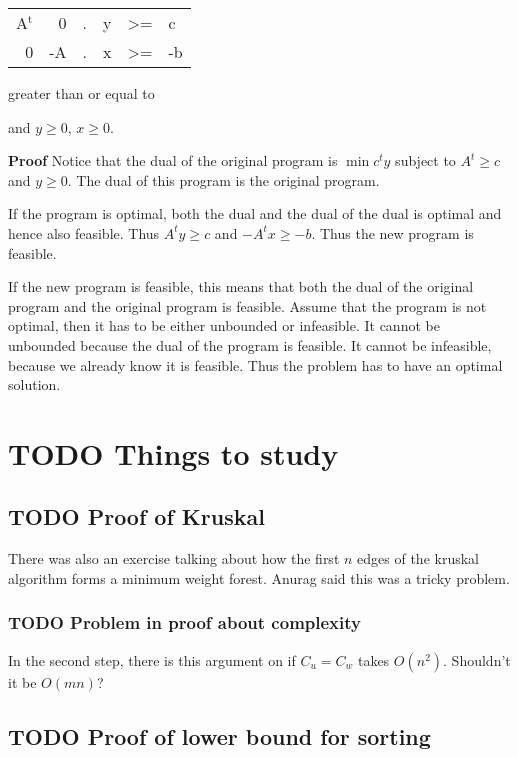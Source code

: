 \documentclass[11pt]{article}
\def\min{\operatorname{min}}
\begin{document}
\begin{center}
\begin{tabular}{rrllll}
A\(^{\text{t}}\) & 0 & . & y & >= & c\\
0 & -A & . & x & >= & -b\\
\end{tabular}
\end{center}

greater than or equal to

and \(y \ge 0\), \(x \ge 0\).

\textbf{Proof} Notice that the dual of the original program is \(\min c^t y\)
subject to \(A^t \ge c\) and \(y \ge 0\). The dual of this program is the
original program.

If the program is optimal, both the dual and the dual of the dual is optimal
and hence also feasible. Thus \(A^t y \ge c\) and \(-A^tx \ge -b\). Thus the new
program is feasible.

If the new program is feasible, this means that both the dual of the
original program and the original program is feasible. Assume that the
program is not optimal, then it has to be either unbounded or infeasible. It
cannot be unbounded because the dual of the program is feasible. It cannot
be infeasible, because we already know it is feasible. Thus the problem has
to have an optimal solution.
\section{{\bfseries\sffamily TODO} Things to study}
\label{sec:org8d93405}
\subsection{{\bfseries\sffamily TODO} Proof of Kruskal}
\label{sec:org4cf9d37}
There was also an exercise talking about how the first \(n\) edges of the
kruskal algorithm forms a minimum weight forest. Anurag said this was a
tricky problem.
\subsubsection{{\bfseries\sffamily TODO} Problem in proof about complexity}
\label{sec:orgeb2df04}
In the second step, there is this argument on if \(C_u = C_w\) takes \(O(n^2)\).
Shouldn't it be \(O(mn)\)?
\subsection{{\bfseries\sffamily TODO} Proof of lower bound for sorting}
\label{sec:org4d0096f}
\end{document}
